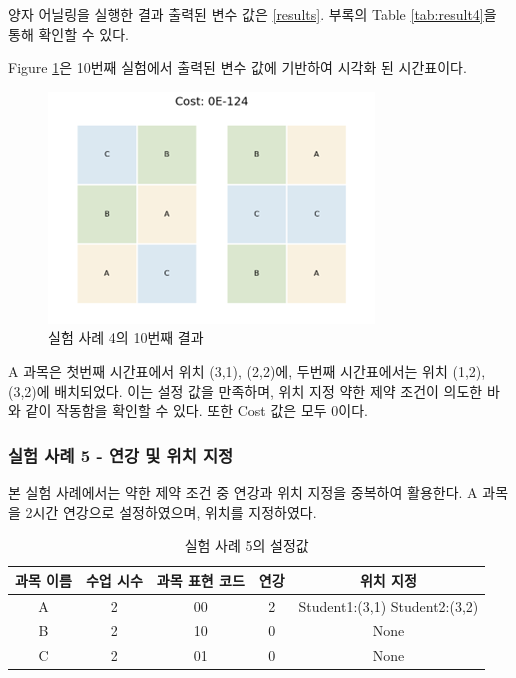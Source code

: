\documentclass[12pt,a4paper]{article}
\begin{document}
    양자 어닐링을 실행한 결과 출력된 변수 값은 \ref{results}. 부록의 Table \ref{tab:result4}을 통해 확인할 수 있다.

    Figure \ref{fig:case4}은 10번째 실험에서 출력된 변수 값에 기반하여 시각화 된 시간표이다. 

    \begin{figure}[htb!]
        \centering
        \includegraphics[width=\textwidth]{Case4.png}
        \caption{실험 사례 4의 10번째 결과}
        \label{fig:case4}
    \end{figure}

    A 과목은 첫번째 시간표에서 위치 (3,1), (2,2)에, 두번째 시간표에서는 위치 (1,2), (3,2)에 배치되었다. 이는 설정 값을 만족하며, 위치 지정 약한 제약 조건이 의도한 바와 같이 작동함을 확인할 수 있다. 또한 Cost 값은 모두 0이다.

    \subsubsection{실험 사례 5 - 연강 및 위치 지정}

    본 실험 사례에서는 약한 제약 조건 중 연강과 위치 지정을 중복하여 활용한다. A 과목을 2시간 연강으로 설정하였으며, 위치를 지정하였다.

    \begin{table}[htb!]
        \centering
        \begin{tabular}{c c c c c}
             \hline
             과목 이름 & 수업 시수 & 과목 표현 코드 & 연강 & 위치 지정\\
             \hline
             A & 2 & 00 & 2 & Student1:(3,1) Student2:(3,2)\\
             B & 2 & 10 & 0 & None\\
             C & 2 & 01 & 0 & None\\
             \hline
        \end{tabular}
        \caption{실험 사례 5의 설정값}\label{tab:testcase5}
    \end{table}
\end{document}
